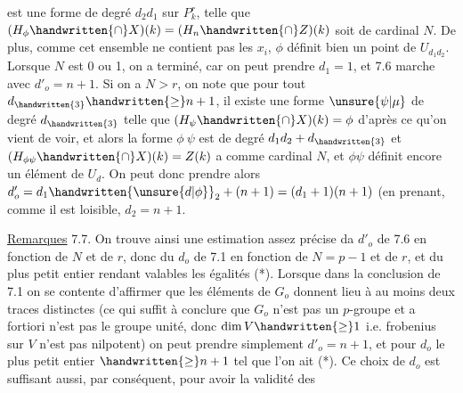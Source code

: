 est une forme de degré $d_2d_1$ sur $P^r_k$, telle que $(H_{\phi}\handwritten{\cap}X)(k)=(H_n\handwritten{\cap}Z)(k)$ soit de cardinal $N$. De plus, comme cet ensemble ne contient pas les $x_i$, $\phi$ définit bien un point de $U_{d_1d_2}$. Lorsque $N$ est 0 ou 1, on a terminé, car on peut prendre $d_1=1$, et 7.6 marche avec $d'_o=n+1$. Si on a $N>r$, on note que pour tout $d_{\handwritten{3}}\handwritten{\geq}n+1$, il existe une forme $\unsure{\psi|\mu}$ de degré $d_{\handwritten{3}}$  telle que $(H_{\psi}\handwritten{\cap}X)(k)=\phi$ d'après ce qu'on vient de voir, et alors la forme $\phi\ \psi$ est de degré  $d_1d_2+d_{\handwritten{3}}$ et $(H_{\phi\psi}\handwritten{\cap}X)(k)=Z(k)$ a comme cardinal $N$, et $\phi\psi$ définit encore un élément de $U_d$. On peut donc prendre alors $d'_o=d_1\handwritten{\unsure{d|\phi}}_2+(n+1)=(d_1+1)(n+1)$ (en prenant, comme il est loisible, $d_2=n+1$.

\uline{Remarques} 7.7.  On trouve ainsi une estimation assez précise da $d'_o$ de 7.6  en fonction de $N$ et de $r$, donc du $d_o$ de 7.1 en fonction de $N=p-1$ et de $r$,  et du plus petit entier rendant valables les égalités (*). Lorsque dans la conclusion de 7.1 on se contente d'affirmer que les éléments de $G_o$ donnent lieu à au moins deux traces distinctes (ce qui suffit à conclure que $G_o$ n'est pas un $p$-groupe et a fortiori n'est pas le groupe unité, donc $\dim V\handwritten{\geq}1$ i.e. frobenius sur $V$ n'est pas nilpotent) on peut prendre  simplement $d'_o=n+1$, et pour $d_o$ le plus petit entier $\handwritten{\geq}n+1$ tel que l'on ait (*). Ce choix de $d_o$ est suffisant aussi, par conséquent, pour avoir la validité des

